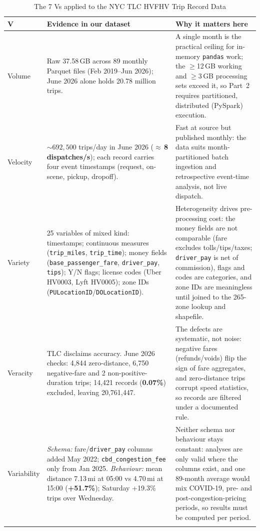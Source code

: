 \begin{table}[htbp]
\centering\footnotesize
\caption{The 7 Vs applied to the NYC TLC HVFHV Trip Record Data}
\label{tab:7vs}
\begin{tabular}{@{}p{1.5cm}p{7.3cm}p{7.3cm}@{}}
\toprule
\textbf{V} & \textbf{Evidence in our dataset} & \textbf{Why it matters here} \\
\midrule

Volume &
Raw 37.58\,GB across 89 monthly Parquet files (Feb 2019--Jun 2026); June 2026
alone holds 20.78 million trips. &
A single month is the practical ceiling for in-memory \texttt{pandas} work;
the $\geq$12\,GB working and $\geq$3\,GB processing sets exceed it, so Part~2
requires partitioned, distributed (PySpark) execution. \\
\addlinespace

Velocity &
${\sim}692{,}500$ trips/day in June 2026 ($\approx$\,\textbf{8 dispatches/s});
each record carries four event timestamps (request, on-scene, pickup,
dropoff). &
Fast at source but published monthly: the data suits month-partitioned batch
ingestion and retrospective event-time analysis, not live dispatch. \\
\addlinespace

Variety &
25 variables of mixed kind: timestamps; continuous measures
(\texttt{trip\_miles}, \texttt{trip\_time}); money fields
(\texttt{base\_passenger\_fare}, \texttt{driver\_pay}, \texttt{tips}); Y/N
flags; license codes (Uber HV0003, Lyft HV0005); zone IDs
(\texttt{PULocationID}/\texttt{DOLocationID}). &
Heterogeneity drives pre-processing cost: the money fields are not comparable
(fare excludes tolls/tips/taxes; \texttt{driver\_pay} is net of commission),
flags and codes are categories, and zone IDs are meaningless until joined to
the 265-zone lookup and shapefile. \\
\addlinespace

Veracity &
TLC disclaims accuracy. June 2026 checks: 4{,}844 zero-distance, 6{,}750
negative-fare and 2 non-positive-duration trips; 14{,}421 records
(\textbf{0.07\%}) excluded, leaving 20{,}761{,}447. &
The defects are systematic, not noise: negative fares (refunds/voids) flip the
sign of fare aggregates, and zero-distance trips corrupt speed statistics, so
records are filtered under a documented rule. \\
\addlinespace

Variability &
\emph{Schema:} fare/\texttt{driver\_pay} columns added May 2022;
\texttt{cbd\_congestion\_fee} only from Jan 2025. \emph{Behaviour:} mean
distance 7.13\,mi at 05:00 vs 4.70\,mi at 15:00 (\textbf{+51.7\%}); Saturday
+19.3\% trips over Wednesday. &
Neither schema nor behaviour stays constant: analyses are only valid where the
columns exist, and one 89-month average would mix COVID-19, pre- and
post-congestion-pricing periods, so results must be computed per period. \\
\addlinespace


\end{tabular}
\end{table}
